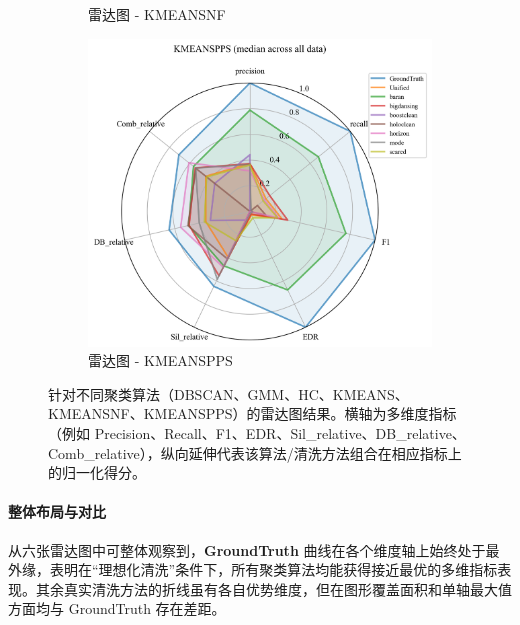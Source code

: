\documentclass[10pt]{article} %
\numberwithin{equation}{section}
\begin{document}
\begin{enumerate}[label=(\alph*)]
\begin{figure}[htbp]
\begin{subfigure}[b]{0.30\linewidth}
        \caption{雷达图 - KMEANSNF}
        \label{fig:radar_kmeansnf}
    \end{subfigure}
    \hfill
    \begin{subfigure}[b]{0.30\linewidth}
        \centering
        \includegraphics[width=\linewidth]{figures/radar graph/radar_KMEANSPPS.png}
        \caption{雷达图 - KMEANSPPS}
        \label{fig:radar_kmeanspps}
    \end{subfigure}

    \caption{针对不同聚类算法（DBSCAN、GMM、HC、KMEANS、KMEANSNF、KMEANSPPS）的雷达图结果。横轴为多维度指标（例如 Precision、Recall、F1、EDR、Sil\_relative、DB\_relative、Comb\_relative），纵向延伸代表该算法/清洗方法组合在相应指标上的归一化得分。}
    \label{fig:all_radar_charts}
\end{figure}

\paragraph{整体布局与对比}  
从六张雷达图中可整体观察到，\textbf{GroundTruth} 曲线在各个维度轴上始终处于最外缘，表明在“理想化清洗”条件下，所有聚类算法均能获得接近最优的多维指标表现。其余真实清洗方法的折线虽有各自优势维度，但在图形覆盖面积和单轴最大值方面均与 GroundTruth 存在差距。


\end{enumerate}
\end{document}
